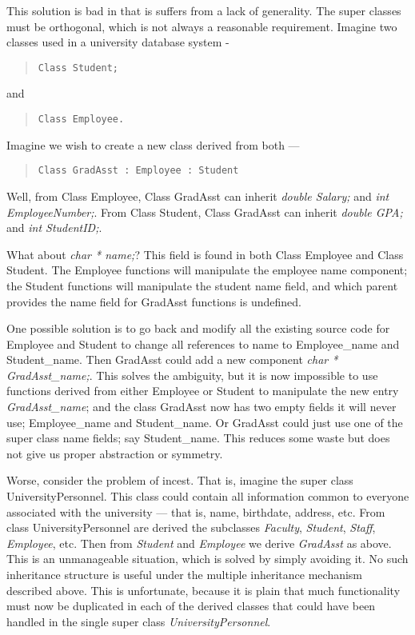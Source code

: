 This solution is bad in that is suffers from a lack of generality.  The
super classes must be orthogonal, which is not always a reasonable
requirement.  Imagine two classes used in a university database system -
\begin{quote} \tt Class Student; \end{quote}
and
\begin{quote}\tt Class Employee. \end{quote}

Imagine we wish to create a new class derived from both ---
\begin{quote} \tt Class GradAsst : Employee : Student \end{quote}

Well, from Class Employee, Class GradAsst can inherit {\em double Salary;}
and {\em int EmployeeNumber;}.  From Class Student, Class GradAsst can
inherit {\em double GPA;} and {\em int StudentID;}.

What about {\em char * name;}?  This field is found in both Class Employee and
Class Student.  The Employee functions will manipulate the employee
name component; the Student functions will manipulate the student name
field, and which parent provides
the name field for GradAsst functions is undefined.

One possible solution is to go back and modify all the existing source code
for Employee and Student to change all references to name to Employee\_name
and Student\_name.  Then GradAsst could add a new component {\em char *
GradAsst\_name;}.  This solves the ambiguity, but it is now impossible
to use functions derived from either Employee or Student to manipulate the
new entry {\em GradAsst\_name}; and the class GradAsst now has two
empty fields it will never use; Employee\_name and Student\_name.  Or
GradAsst could just use one of the super class name fields; say
Student\_name.  This reduces some waste but does not give us proper
abstraction or symmetry.

Worse, consider the problem of incest.  That is, imagine the super class
UniversityPersonnel.  This class could contain all information common to
everyone associated with the university --- that is, name, birthdate,
address, etc.  From class UniversityPersonnel are derived the subclasses
{\em Faculty}, {\em Student}, {\em Staff}, {\em Employee}, etc.
Then from {\em Student} and
{\em Employee} we derive {\em GradAsst} as above.  This is an unmanageable
situation, which is solved by simply avoiding it.  No such inheritance
structure is useful under the multiple inheritance mechanism described
above.  This is unfortunate, because it is plain that much functionality
must now be duplicated in each of the derived classes that could have been
handled in the single super class {\em UniversityPersonnel}.


